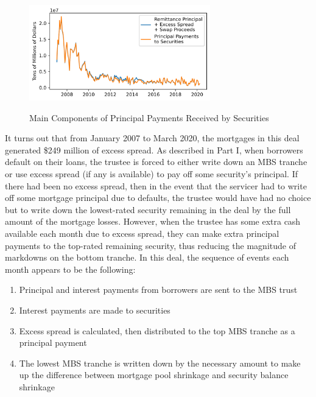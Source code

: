 \documentclass[12pt]{article}
\begin{document}
\begin{figure}[h]
	\centering
	\caption{Main Components of Principal Payments Received by Securities}
	\includegraphics[width=0.7\textwidth]{../figures/timeseries_security_principal_pmts_composition}
	\label{fig:timeseries_security_principal_pmts_composition}
\end{figure}

It turns out that from January 2007 to March 2020, the mortgages in this deal generated \$249 million of excess spread. As described in Part I, when borrowers default on their loans, the trustee is forced to either write down an MBS tranche or use excess spread (if any is available) to pay off some security's principal. If there had been no excess spread, then in the event that the servicer had to write off some mortgage principal due to defaults, the trustee would have had no choice but to write down the lowest-rated security remaining in the deal by the full amount of the mortgage losses. However, when the trustee has some extra cash available each month due to excess spread, they can make extra principal payments to the top-rated remaining security, thus reducing the magnitude of markdowns on the bottom tranche. In this deal, the sequence of events each month appears to be the following:

\begin{enumerate}
	\item Principal and interest payments from borrowers are sent to the MBS trust
	\item Interest payments are made to securities
	\item Excess spread is calculated, then distributed to the top MBS tranche as a principal payment
	\item The lowest MBS tranche is written down by the necessary amount to make up the difference between mortgage pool shrinkage and security balance shrinkage
\end{enumerate}
\end{document}
